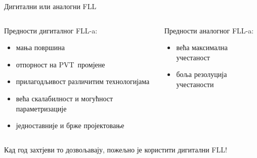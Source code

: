 \documentclass[aspectratio=169]{beamer}
\def \FLL  {FLL} %
\def \PVT  {PVT} %
\begin{document}
\begin{frame}{\secname}
    \begin{center}
	    \color{BrickRed}Дигитални \color{black} или \color{RoyalBlue} аналогни \color{black} FLL
    \end{center}	  
  	 \medskip    
    \begin{columns}[t]
        \begin{column}{0.5\textwidth}
			\color{black} Предности дигиталног \FLL-a:
			\begin{itemize}
			    \color{BrickRed}
				\item мања површина
				\item отпорност на \PVT\ промјене
				\item прилагодљивост различитим технологијама
				\item већа скалабилност и могућност параметризације
				\item једноставније и брже пројектовање
			\end{itemize}
		\end{column}
		\bigskip
		\begin{column}{0.5\textwidth}
			\color{black} Предности аналогног \FLL-a:
			\begin{itemize}
				\color{RoyalBlue}
				\item већа максимална учестаност
				\item боља резолуција учестаности
			\end{itemize}
		\end{column}
	\end{columns}
	\bigskip
	\begin{center}
		Кад год захтјеви то дозвољавају, пожељно је користити дигитални \FLL!
    \end{center}	
\end{frame}
\end{document}
